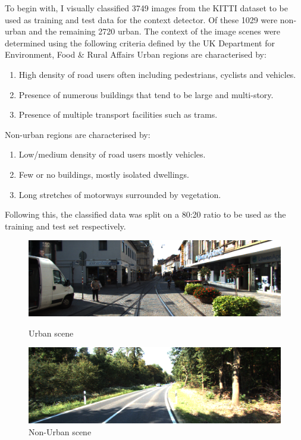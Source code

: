 To begin with, I visually classified 3749 images from the KITTI dataset to be used as training and test data for the context detector. Of these 1029 were non-urban and the remaining 2720 urban. 
The context of the image scenes were determined using the following criteria defined by the UK Department for Environment, Food \& Rural Affairs \cite{2011ruralurbanclassification}
\noindent
Urban regions are characterised by:
\begin{enumerate}
	\item High density of road users often including pedestrians, cyclists and vehicles. 
	\item Presence of numerous  buildings that tend to be large and multi-story. 
	\item Presence of multiple transport facilities such as trams. 
\end{enumerate}

\noindent
Non-urban regions are characterised by: 
\begin{enumerate}
	\item Low/medium density of road users mostly vehicles.
	\item Few or no buildings, mostly isolated dwellings.
	\item Long stretches of motorways surrounded by vegetation. 
\end{enumerate}

Following this, the classified data was split on a 80:20 ratio to be used as the training and test set respectively. 

\begin{figure}[h]
	\centering
	\begin{minipage}[b]{0.4\textwidth}
		\includegraphics[width=\textwidth]{images/urban.png}
		\caption{Urban scene}
	\end{minipage}
	\hfill
	\begin{minipage}[b]{0.4\textwidth}
		\includegraphics[width=\textwidth]{images/non_urban.png}
		\caption{Non-Urban scene}
	\end{minipage}
\end{figure}



